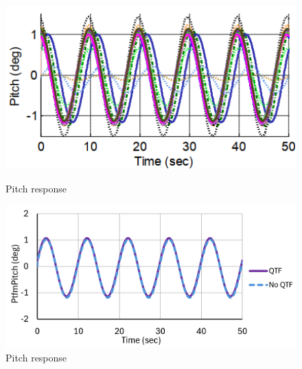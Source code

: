 \documentclass[a4paper, 11pt]{article}
\begin{document}
\begin{figure}[H]
    \begin{minipage}{0.48\textwidth}
        \centering
        \includegraphics[width=1\textwidth]{2.1_pitch.png}
        \caption{\small Pitch response \cite{Robertson2014}}
        \label{fig:2.1_pitch}
    \end{minipage}
    \hfill
    \begin{minipage}{0.51\textwidth}
        \centering
        \includegraphics[width=1\textwidth]{2.1_pitch_mine.png}
        \caption{\small Pitch response}
        \label{fig:2.1_pitch_mine}
    \end{minipage}
\end{figure}
\end{document}
